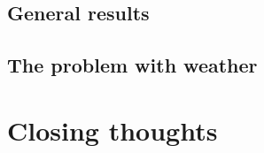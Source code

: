 \documentclass[11pt]{article} %
\begin{document}
\subsection{General results}
\label{sec:gen_results}
% 
% 

\subsection{The problem with weather}
\label{sec:weather_prob}


\section{Closing thoughts}
\label{sec:summary}
 

 



\newpage 



\end{document}
